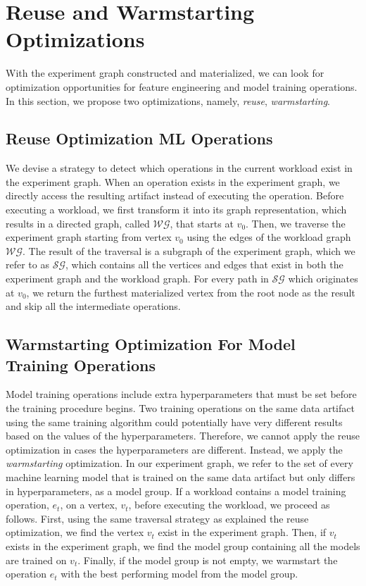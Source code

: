\section{Reuse and Warmstarting Optimizations}\label{sec-reuse-and-warmstarting}
With the experiment graph constructed and materialized, we can look for optimization opportunities for feature engineering and model training operations.
In this section, we propose two optimizations, namely, \textit{reuse}, \textit{warmstarting}.

\subsection{Reuse Optimization ML Operations}
We devise a strategy to detect which operations in the current workload exist in the experiment graph.
When an operation exists in the experiment graph, we directly access the resulting artifact instead of executing the operation.
Before executing a workload, we first transform it into its graph representation, which results in a directed graph, called $\mathcal{WG}$, that starts at $v_0$.
Then, we traverse the experiment graph starting from vertex $v_0$ using the edges of the workload graph $\mathcal{WG}$.
The result of the traversal is a subgraph of the experiment graph, which we refer to as $\mathcal{SG}$, which contains all the vertices and edges that exist in both the experiment graph and the workload graph.
For every path in $\mathcal{SG}$ which originates at $v_0$, we return the furthest materialized vertex from the root node as the result and skip all the intermediate operations.

\subsection{Warmstarting Optimization For Model Training Operations}
Model training operations include extra hyperparameters that must be set before the training procedure begins.
Two training operations on the same data artifact using the same training algorithm could potentially have very different results based on the values of the hyperparameters.
Therefore, we cannot apply the reuse optimization in cases the hyperparameters are different.
Instead, we apply the \textit{warmstarting} optimization.
In our experiment graph, we refer to the set of every machine learning model that is trained on the same data artifact but only differs in hyperparameters, as a model group.
If a workload contains a model training operation, $e_{t}$, on a vertex, $v_{t}$, before executing the workload, we proceed as follows.
First, using the same traversal strategy as explained the reuse optimization, we find the vertex $v_{t}$ exist in the experiment graph.
Then, if $v_{t}$ exists in the experiment graph, we find the model group containing all the models are trained on $v_{t}$.
Finally, if the model group is not empty, we warmstart the operation $e_{t}$ with the best performing model from the model group.

